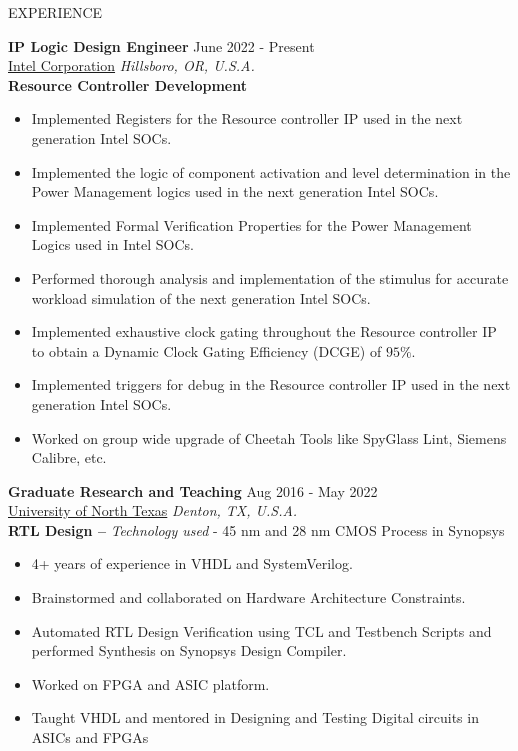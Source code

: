 \documentclass{resume} %
\begin{document}
\begin{rSection}{EXPERIENCE}

    \textbf{IP Logic Design Engineer} \hfill June 2022 - Present \\
    \href{https://www.intel.com/content/www/us/en/homepage.html}{Intel Corporation} \hfill \textit{Hillsboro, OR, U.S.A.} \\
    \textbf{Resource Controller Development}
        \begin{itemize}
            \itemsep -3pt {} 
            \item Implemented Registers for the Resource controller IP used in the next generation Intel SOCs.
            \item Implemented the logic of component activation and level determination in the Power Management logics used in the next generation Intel SOCs.
            \item Implemented Formal Verification Properties for the Power Management Logics used in Intel SOCs.
            \item Performed thorough analysis and implementation of the stimulus for accurate workload simulation of the next generation Intel SOCs.
            \item Implemented exhaustive clock gating throughout the Resource controller IP to obtain a Dynamic Clock Gating Efficiency (DCGE) of $95\%$.
            \item Implemented triggers for debug in the Resource controller IP used in the next generation Intel SOCs.
            \item Worked on group wide upgrade of Cheetah Tools like SpyGlass Lint, Siemens Calibre, etc.
        \end{itemize}
        
    \textbf{Graduate Research and Teaching} \hfill Aug 2016 - May 2022 \\
    \href{https://www.unt.edu}{University of North Texas} \hfill \textit{Denton, TX, U.S.A.} \\
    \textbf{RTL Design --} \textit{Technology used} - 45 nm and 28 nm CMOS Process in Synopsys
        \begin{itemize}
            \itemsep -3pt {} 
            \item 4+ years of experience in VHDL and SystemVerilog.
            \item Brainstormed and collaborated on Hardware Architecture Constraints.
            \item Automated RTL Design Verification using TCL and Testbench Scripts and performed Synthesis on Synopsys Design Compiler.
            \item Worked on FPGA and ASIC platform.
            \item Taught VHDL and mentored in Designing and Testing Digital circuits in ASICs and FPGAs
        \end{itemize}
    

\end{rSection}
\end{document}
